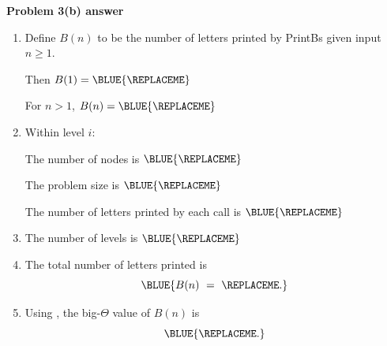 \textbf{Problem 3(b) answer}


\begin{enumerate}
  
\item[(i)] Define $B(n)$ to be the number of letters printed by {\sc PrintBs} given input $n\ge 1$.

  Then $B(1) = \BLUE{
    \REPLACEME 
  }$

  For $n>1$, $B(n) = \BLUE{
    \REPLACEME 
  }$
  
\item[(ii)] Within level $i$:

  The number of nodes is $\BLUE{
    \REPLACEME 
  }$
  
  The problem size is $\BLUE{
    \REPLACEME 
  }$

  The number of letters printed by each call is $\BLUE{
    \REPLACEME 
  }$

\item[(iii)] The number of levels is $\BLUE{
    \REPLACEME 
  }$
  
\item[(iv)] The total number of letters printed is 
  \[ \BLUE{B(n) ~=~ 
      \REPLACEME
    .}
  \]

\item[(v)] Using
  \BLUE{
    \REPLACEME
  },
  the big-$\Theta$ value of $B(n)$ is
  \[\BLUE{
      \REPLACEME
    .}\]

\end{enumerate}

